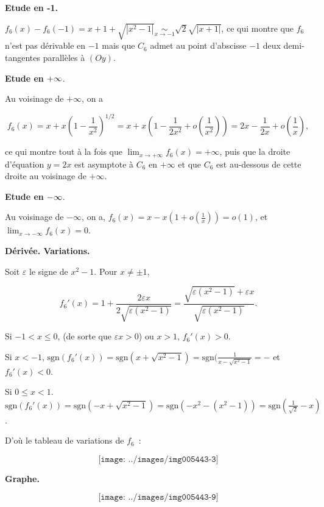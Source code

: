 {\begin{enumerate}
{{{{{{\textbf{Etude en -1.}

$f_6(x)-f_6(-1)=x+1+\sqrt{|x^2-1|}\underset{x\rightarrow-1}{\sim}\sqrt{2}\sqrt{|x+1|}$,  ce qui montre que $f_6$ n'est pas dérivable en $-1$ mais que $C_6$ admet au point d'abscisse $-1$ deux demi-tangentes parallèles à $(Oy)$.

\textbf{Etude en} $\bf{+{\infty}}$.

Au voisinage de $+\infty$, on a

$$f_6(x)=x+x(1-\frac{1}{x^2})^{1/2}=x+x(1-\frac{1}{2x^2}+o(\frac{1}{x^2}))=2x-\frac{1}{2x}+o(\frac{1}{x}),$$

ce qui montre tout à la fois que $\lim_{x\rightarrow +\infty}f_6(x)=+\infty$, puis que la droite d'équation $y=2x$ est asymptote à $C_6$ en $+\infty$ et que $C_6$ est au-dessous de cette droite au voisinage de $+\infty$.

\textbf{Etude en} $\bf{-{\infty}}$.

Au voisinage de $-\infty$, on a, $f_6(x)=x-x(1+o(\frac{1}{x}))=o(1)$, et $\lim_{x\rightarrow -\infty}f_6(x)=0$.

\textbf{Dérivée. Variations.}

Soit $\varepsilon$ le signe de $x^2-1$. Pour $x\neq\pm1$, 

$$f_6'(x)=1+\frac{2\varepsilon x}{2\sqrt{\varepsilon(x^2-1)}}=\frac{\sqrt{\varepsilon(x^2-1)}+\varepsilon x}{\sqrt{\varepsilon(x^2-1)}}.$$

Si $-1<x\leq0$, (de sorte que $\varepsilon x>0$) ou $x>1$, $f_6'(x)>0$.

Si $x<-1$, $\mbox{sgn}(f_6'(x))=\mbox{sgn}(x+\sqrt{x^2-1})=\mbox{sgn}(\frac{1}{x-\sqrt{x^2-1}}=-$ et $f_6'(x)<0$.

Si $0\leq x<1$. $\mbox{sgn}(f_6'(x))=\mbox{sgn}(-x+\sqrt{x^2-1})=\mbox{sgn}(-x^2-(x^2-1))=\mbox{sgn}(\frac{1}{\sqrt{2}}-x)$.

D'où le tableau de variations de $f_6$~:

$$\texttt{[image: ../images/img005443-3]}$$



\textbf{Graphe.}

$$\texttt{[image: ../images/img005443-9]}$$



  \item \reponse{$$\texttt{[image: ../images/img005443-10]}$$


  \item \reponse{%
  \item \reponse{%
  \item \reponse{$$\texttt{[image: ../images/img005443-11]}$$


}}}}}}}}}}
\end{enumerate}}
